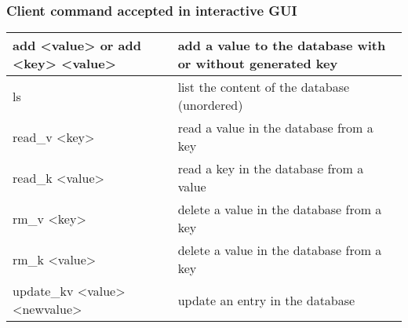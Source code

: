 \documentclass[a4paper,11pt]{report}
\begin{document}
\begin{centering}
        \subsubsection*{Client command accepted in interactive GUI}
        \begin{tabular}{|m{7cm}|m{8cm}|}
            \hline
            add <value> or add <key> <value> & add a value to the database with or without generated key \\
            \hline
            ls & list the content of the database (unordered) \\
            \hline
            read\_v <key> & read a value in the database from a key \\
            \hline
            read\_k <value> & read a key in the database from a value \\
            \hline
            rm\_v <key> & delete a value in the database from a key \\
            \hline
            rm\_k <value> & delete a value in the database from a key \\
            \hline
            update\_kv <value> <newvalue> & update an entry in the database \\
            \hline
        \end{tabular}
    \end{centering}
\end{document}
